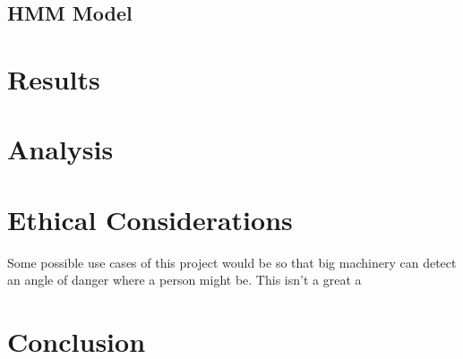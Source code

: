 \documentclass[11pt]{amsart}
\begin{document}
\subsection{HMM Model}

\section{Results}

\section{Analysis}

\section{Ethical Considerations}
Some possible use cases of this project would be so that big machinery can detect an angle of danger where a person might be. 
This isn't a great a 

\section{Conclusion}
\end{document}
